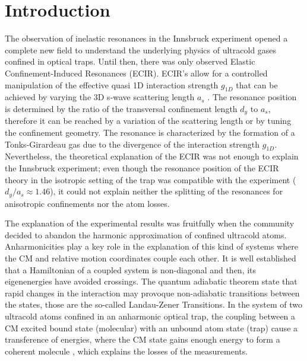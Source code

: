 \documentclass[aps,pre,twocolumn,superscriptaddress,showpacs]{revtex4-1}
\begin{document}
\section{Introduction}  \label{sec:intro}
The observation of inelastic resonances in the Innsbruck experiment \cite{PhysRevLett.104.153203} opened a complete new field to understand the underlying physics of ultracold gases confined in optical traps. Until then, there was only observed Elastic Confinement-Induced Resonances (ECIR). ECIR's allow for a controlled manipulation of the effective quasi 1D interaction strength $g_{1D}$ that can be achieved by varying the 3D s-wave scattering length $a_s$ \cite{dunjko2011confinement}. The resonance position is determined by the ratio of the transversal confinement length $d_y$ to $a_s$, therefore it can be reached by a variation of the scattering length or by tuning the confinement geometry. The resonance is characterized by the formation of a Tonks-Girardeau gas due to the divergence of the interaction strength $g_{1D}$. Nevertheless, the theoretical explanation of the ECIR was not enough to explain the Innsbruck experiment; even though the resonance position of the ECIR theory in the isotropic setting of the trap was compatible with the experiment ($d_y/a_s\approx 1.46$), it could not explain neither the splitting of the resonances for anisotropic confinements nor the atom losses.

The explanation of the experimental results was fruitfully when the community decided to abandon the harmonic approximation of confined ultracold atoms. Anharmonicities play a key role in the explanation of this kind of systems where the CM and relative motion coordinates couple each other. It is well established that a Hamiltonian of a coupled system is non-diagonal and then, its eigenenergies have avoided crossings. The quantum adiabatic theorem state that rapid changes in the interaction may provoque non-adiabatic transitions between the states, those are the so-called Landau-Zener Transitions. In the system of two ultracold atoms confined in an anharmonic optical trap, the coupling between a CM excited bound state (molecular) with an unbound atom state (trap) cause a transference of energies, where the CM state gains enough energy to form a coherent molecule \cite{PhysRevLett.110.203202}, which explains the losses of the measurements.
\end{document}
